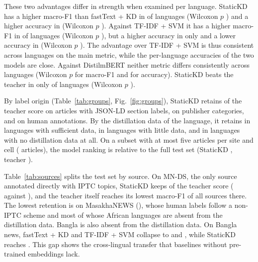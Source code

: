 These two advantages differ in strength when examined per language. StaticKD has a higher macro-F1 than fastText + KD in  of  languages (Wilcoxon $p$ ) and a higher accuracy in  (Wilcoxon $p$ ). Against TF-IDF + SVM it has a higher macro-F1 in  of  languages (Wilcoxon $p$ ), but a higher accuracy in only  and a lower accuracy in  (Wilcoxon $p$ ). The advantage over TF-IDF + SVM is thus consistent across languages on the main metric, while the per-language accuracies of the two models are close. Against DistilmBERT neither metric differs consistently across languages (Wilcoxon $p$  for macro-F1 and  for accuracy). StaticKD beats the teacher in only  of  languages (Wilcoxon $p$ ).

By label origin (Table~\ref{tab:groups}, Fig.~\ref{fig:groups}), StaticKD retains  of the teacher score on articles with JSON-LD section labels,  on publisher categories, and  on human annotations. By the distillation data of the language, it retains  in languages with sufficient data,  in languages with little data, and  in languages with no distillation data at all. On a subset with at most five articles per site and cell ( articles), the model ranking is  relative to the full test set (StaticKD , teacher ).

\TabGroups

Table~\ref{tab:sources} splits the test set by source. On MN-DS, the only source annotated directly with IPTC topics, StaticKD keeps  of the teacher score ( against ), and the teacher itself reaches its lowest macro-F1 of all sources there. The lowest retention is on MasakhaNEWS (), whose human labels follow a non-IPTC scheme and most of whose African languages are absent from the distillation data. Bangla is also absent from the distillation data. On Bangla news, fastText + KD and TF-IDF + SVM collapse to  and , while StaticKD reaches . This gap shows the cross-lingual transfer that baselines without pre-trained embeddings lack.

